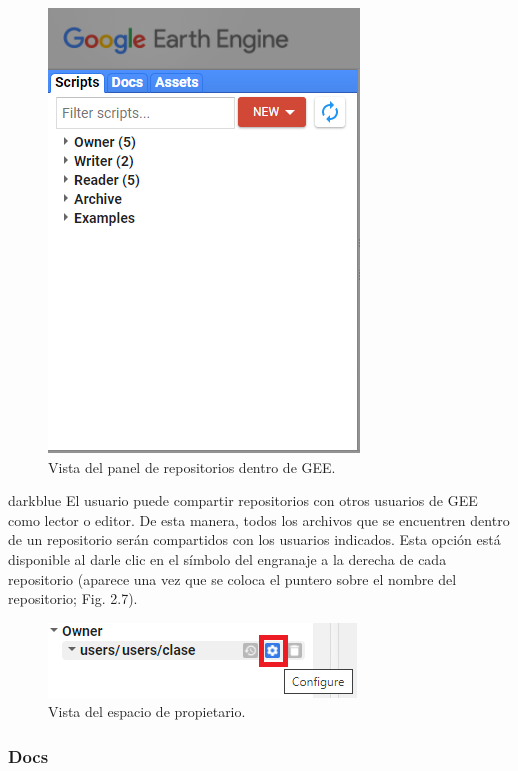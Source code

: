 \documentclass[
  12pt,
  letterpaper,
  twoside]{book}
\begin{document}
\begin{figure}[btp]

{\centering \includegraphics[width=0.4\linewidth]{Img/left_panel} 

}

\caption{Vista del panel de repositorios dentro de GEE.}\label{fig:unnamed-chunk-7}
\end{figure}

\begin{bluebox2}

\begin{awesomeblock}{5pt}{\faLightbulb}{darkblue}
El usuario puede compartir repositorios con otros usuarios de GEE como lector o editor. De esta manera, todos los archivos que se encuentren dentro de un repositorio serán compartidos con los usuarios indicados. Esta opción está disponible al darle clic en el símbolo del engranaje a la derecha de cada repositorio (aparece una vez que se coloca el puntero sobre el nombre del repositorio; Fig. 2.7).

\end{awesomeblock}

\end{bluebox2}

\begin{figure}[btp]

{\centering \includegraphics[width=0.4\linewidth]{Img/engranaje} 

}

\caption{Vista del espacio de propietario.}\label{fig:unnamed-chunk-8}
\end{figure}

\hypertarget{docs}{%
\subsubsection*{Docs}\label{docs}}
\end{document}
